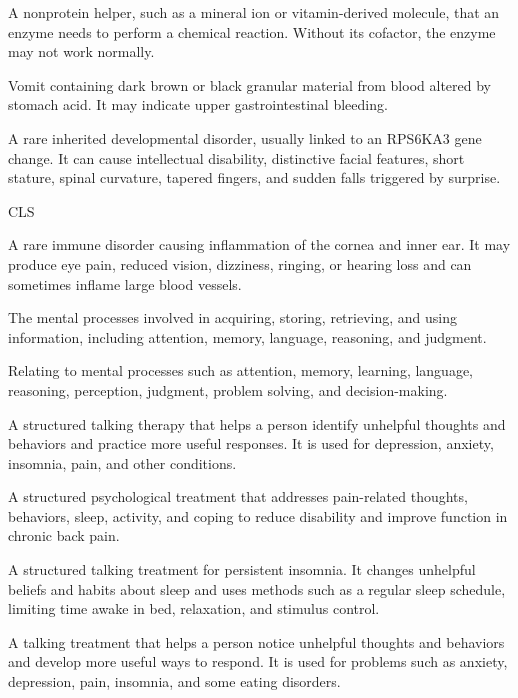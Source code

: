  A nonprotein helper, such as a mineral ion or vitamin-derived molecule, that an enzyme needs to perform a chemical reaction. Without its cofactor, the enzyme may not work normally.

 Vomit containing dark brown or black granular material from blood altered by stomach acid. It may indicate upper gastrointestinal bleeding.

 A rare inherited developmental disorder, usually linked to an RPS6KA3 gene change. It can cause intellectual disability, distinctive facial features, short stature, spinal curvature, tapered fingers, and sudden falls triggered by surprise.

\synonyms
CLS

 A rare immune disorder causing inflammation of the cornea and inner ear. It may produce eye pain, reduced vision, dizziness, ringing, or hearing loss and can sometimes inflame large blood vessels.

 The mental processes involved in acquiring, storing, retrieving, and using information, including attention, memory, language, reasoning, and judgment.

 Relating to mental processes such as attention, memory, learning, language, reasoning, perception, judgment, problem solving, and decision-making.

 A structured talking therapy that helps a person identify unhelpful thoughts and behaviors and practice more useful responses. It is used for depression, anxiety, insomnia, pain, and other conditions.

 A structured psychological treatment that addresses pain-related thoughts, behaviors, sleep, activity, and coping to reduce disability and improve function in chronic back pain.

 A structured talking treatment for persistent insomnia. It changes unhelpful beliefs and habits about sleep and uses methods such as a regular sleep schedule, limiting time awake in bed, relaxation, and stimulus control.

 A talking treatment that helps a person notice unhelpful thoughts and behaviors and develop more useful ways to respond. It is used for problems such as anxiety, depression, pain, insomnia, and some eating disorders.


